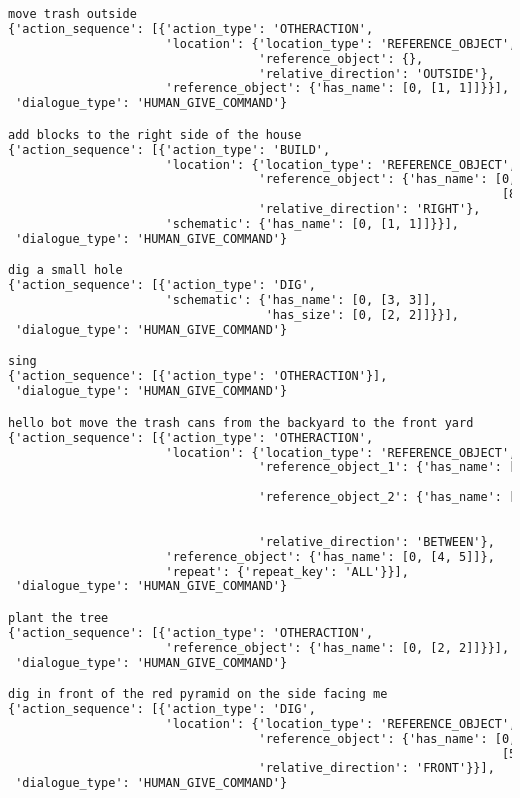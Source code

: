 \begin{lstlisting}[language=TeX]
move trash outside
{'action_sequence': [{'action_type': 'OTHERACTION',
                      'location': {'location_type': 'REFERENCE_OBJECT',
                                   'reference_object': {},
                                   'relative_direction': 'OUTSIDE'},
                      'reference_object': {'has_name': [0, [1, 1]]}}],
 'dialogue_type': 'HUMAN_GIVE_COMMAND'}

add blocks to the right side of the house
{'action_sequence': [{'action_type': 'BUILD',
                      'location': {'location_type': 'REFERENCE_OBJECT',
                                   'reference_object': {'has_name': [0,
                                                                     [8, 8]]},
                                   'relative_direction': 'RIGHT'},
                      'schematic': {'has_name': [0, [1, 1]]}}],
 'dialogue_type': 'HUMAN_GIVE_COMMAND'}

dig a small hole
{'action_sequence': [{'action_type': 'DIG',
                      'schematic': {'has_name': [0, [3, 3]],
                                    'has_size': [0, [2, 2]]}}],
 'dialogue_type': 'HUMAN_GIVE_COMMAND'}

sing
{'action_sequence': [{'action_type': 'OTHERACTION'}],
 'dialogue_type': 'HUMAN_GIVE_COMMAND'}

hello bot move the trash cans from the backyard to the front yard
{'action_sequence': [{'action_type': 'OTHERACTION',
                      'location': {'location_type': 'REFERENCE_OBJECT',
                                   'reference_object_1': {'has_name': [0,
                                                                       [6, 8]]},
                                   'reference_object_2': {'has_name': [0,
                                                                       [9,
                                                                        12]]},
                                   'relative_direction': 'BETWEEN'},
                      'reference_object': {'has_name': [0, [4, 5]]},
                      'repeat': {'repeat_key': 'ALL'}}],
 'dialogue_type': 'HUMAN_GIVE_COMMAND'}

plant the tree
{'action_sequence': [{'action_type': 'OTHERACTION',
                      'reference_object': {'has_name': [0, [2, 2]]}}],
 'dialogue_type': 'HUMAN_GIVE_COMMAND'}

dig in front of the red pyramid on the side facing me
{'action_sequence': [{'action_type': 'DIG',
                      'location': {'location_type': 'REFERENCE_OBJECT',
                                   'reference_object': {'has_name': [0,
                                                                     [5, 11]]},
                                   'relative_direction': 'FRONT'}}],
 'dialogue_type': 'HUMAN_GIVE_COMMAND'}


\end{lstlisting}
